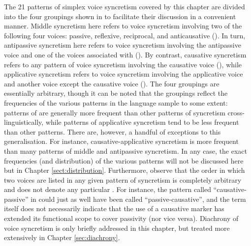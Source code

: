 The 21 patterns of simplex voice syncretism covered by this chapter are divided into the four groupings shown in  to facilitate their discussion in a convenient manner. Middle syncretism here refers to voice syncretism involving two of the following four voices: passive, reflexive, reciprocal, and anticausative (). In turn, antipassive syncretism here refers to voice syncretism involving the antipassive voice and one of the voices associated with  (). By contrast, causative syncretism refers to any pattern of voice syncretism involving the causative voice (), while applicative syncretism refers to voice syncretism involving the applicative voice and another voice except the causative voice (). The four groupings are essentially arbitrary, though it can be noted that the groupings reflect the frequencies of the various patterns in the language sample to some extent: patterns of  are generally more frequent than other patterns of syncretism cross-linguistically, while patterns of applicative syncretism tend to be less frequent than other patterns. There are, however, a handful of exceptions to this generalisation. For instance, causative-applicative syncretism is more frequent than many patterns of middle and antipassive syncretism. In any case, the exact frequencies (and distribution) of the various patterns will not be discussed here but in Chapter \ref{sect:distribution}. Furthermore, observe that the order in which two voices are listed in any given pattern of syncretism is completely arbitrary and does not denote any particular . For instance, the pattern called “causative-passive” in  could just as well have been called “passive-causative”, and the term itself does not necessarily indicate that the use of a causative marker has extended its functional scope to cover passivity (nor vice versa). Diachrony of voice syncretism is only briefly addressed in this chapter, but treated more extensively in Chapter \ref{sec:diachrony}. 

